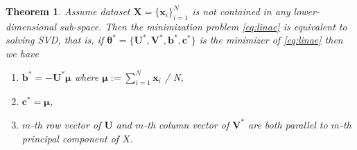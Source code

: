 \documentclass{article}
\newtheorem{theorem}{Theorem}
\begin{document}
    \begin{theorem}
      \label{th:svd}
      Assume dataset $\mathbf{X} = \{\mathbf{x}_i \}_{i=1}^N$
      is not contained in any lower-dimensional sub-space.
      Then the minimization problem \ref{eq:linae} is equivalent to solving SVD, that is, if $\mathbf{\theta}^\ast = \{\mathbf{U}^\ast, \mathbf{V}^\ast, \mathbf{b}^\ast, \mathbf{c}^\ast\}$ is the minimizer of \ref{eq:linae} then we have 
      \begin{enumerate}
        \item $\mathbf{b}^\ast = -\mathbf{U}^\ast \mathbf{\mu}$ where $\mathbf{\mu} := \sum_{i=1}^N \mathbf{x}_i$ / N,
        \item $\mathbf{c}^\ast = \mathbf{\mu}$,
        \item $m$-th row vector of $\mathbf{U}$ and $m$-th column vector of $\mathbf{V}^\ast$ are both parallel to $m$-th principal component of $X$.
      \end{enumerate}
    \end{theorem}
\end{document}
